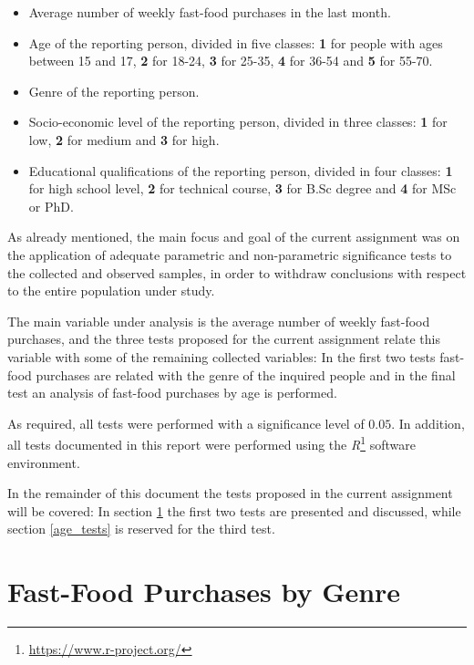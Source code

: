 \documentclass[12pt]{article}
\begin{document}
\begin{itemize}
	\item Average number of weekly fast-food purchases in the last month.
	
	\item Age of the reporting person, divided in five classes: \textbf{1} for people with ages between 15 and 17, \textbf{2} for 18-24, \textbf{3} for 25-35, \textbf{4} for 36-54 and \textbf{5} for 55-70.

	\item Genre of the reporting person.
	
	\item Socio-economic level of the reporting person, divided in three classes: \textbf{1} for low, \textbf{2} for medium and \textbf{3} for high.
	
	\item Educational qualifications of the reporting person, divided in four classes: \textbf{1} for high school level, \textbf{2} for technical course, \textbf{3} for B.Sc degree and \textbf{4} for MSc or PhD.
\end{itemize}

As already mentioned, the main focus and goal of the current assignment was on the application of adequate parametric and non-parametric significance tests to the collected and observed samples, in order to withdraw conclusions with respect to the entire population under study.

The main variable under analysis is the average number of weekly fast-food purchases, and the three tests proposed for the current assignment relate this variable with some of the remaining collected variables: In the first two tests fast-food purchases are related with the genre of the inquired people and in the final test an analysis of fast-food purchases by age is performed.

As required, all tests were performed with a significance level of $0.05$. In addition, all tests documented in this report were performed using the \emph{R}\footnote{\url{https://www.r-project.org/}} software environment.

In the remainder of this document the tests proposed in the current assignment will be covered: In section \ref{genre_tests} the first two tests are presented and discussed, while section \ref{age_tests} is reserved for the third test.

\section{Fast-Food Purchases by Genre}
\label{genre_tests}
\end{document}
